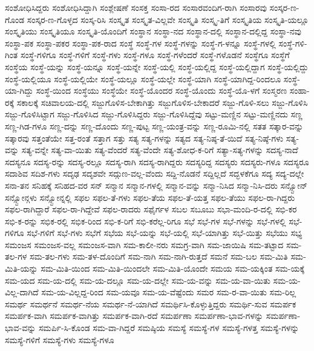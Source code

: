 {ಸಂಶೋಧಿಸಿದ್ದರು
ಸಂಶೋಧಿಸಿದ್ದಾಗಿ
ಸಂಶ್ಲೇಷಣೆ
ಸಂಸಕ್ತ
ಸಂಸಾ-ರದ
ಸಂಸಾರವಂದಿಗ-ರಾಗಿ
ಸಂಸಾರವು
ಸಂಸ್ಕರ-ಣ-ಗೊಂಡ
ಸಂಸ್ಕರ-ಣ-ಗೊಳ್ಳದ
ಸಂಸ್ಕ-ರಿಸಿ
ಸಂಸ್ಕೃತ
ಸಂಸ್ಕೃತ-ವಿಲ್ಲವೇ
ಸಂಸ್ಕೃತಿ
ಸಂಸ್ಕೃ-ತಿಗೆ
ಸಂಸ್ಕೃತಿಯ
ಸಂಸ್ಕೃತಿ-ಯಲ್ಲೂ
ಸಂಸ್ಕೃತಿಯು
ಸಂಸ್ಕೃತಿಯೂ
ಸಂಸ್ಕೃತಿ-ಯೊಂದಿಗೆ
ಸಂಸ್ಥಾನ
ಸಂಸ್ಥಾ-ನದ
ಸಂಸ್ಥಾನ-ದಲ್ಲಿ
ಸಂಸ್ಥಾನ-ದಲ್ಲಿದ್ದ
ಸಂಸ್ಥಾ-ನವು
ಸಂಸ್ಥಾ-ಪಕ
ಸಂಸ್ಥಾ-ಪಕರ
ಸಂಸ್ಥಾ-ಪಕ-ರಾದ
ಸಂಸ್ಥೆ
ಸಂಸ್ಥೆ-ಗಳ
ಸಂಸ್ಥೆ-ಗಳನ್ನು
ಸಂಸ್ಥೆ-ಗ-ಳನ್ನೂ
ಸಂಸ್ಥೆ-ಗಳಲ್ಲಿ
ಸಂಸ್ಥೆ-ಗಳಿ-ಗಿಂತ
ಸಂಸ್ಥೆ-ಗಳಿಗೂ
ಸಂಸ್ಥೆ-ಗಳಿಗೆ
ಸಂಸ್ಥೆ-ಗಳು
ಸಂಸ್ಥೆ-ಗಳೂ
ಸಂಸ್ಥೆ-ಗಳೆಂದರೆ
ಸಂಸ್ಥೆ-ಗಳೊಡನೆ
ಸಂಸ್ಥೆಗೂ
ಸಂಸ್ಥೆಗೆ
ಸಂಸ್ಥೆಯ
ಸಂಸ್ಥೆ-ಯನ್ನು
ಸಂಸ್ಥೆ-ಯನ್ನೂ
ಸಂಸ್ಥೆ-ಯನ್ನೇ
ಸಂಸ್ಥೆ-ಯಲ್ಲಿ
ಸಂಸ್ಥೆ-ಯಲ್ಲಿದ್ದ
ಸಂಸ್ಥೆ-ಯಲ್ಲಿದ್ದಾಗ
ಸಂಸ್ಥೆ-ಯಲ್ಲಿದ್ದು
ಸಂಸ್ಥೆ-ಯಲ್ಲಿಯೂ
ಸಂಸ್ಥೆ-ಯಲ್ಲಿಯೇ
ಸಂಸ್ಥೆ-ಯಲ್ಲೂ
ಸಂಸ್ಥೆ-ಯಲ್ಲೇ
ಸಂಸ್ಥೆ-ಯಾಗಿ
ಸಂಸ್ಥೆ-ಯಾಗಿದ್ದ-ರಿಂದಲೂ
ಸಂಸ್ಥೆ-ಯಾ-ಗಿದ್ದು
ಸಂಸ್ಥೆ-ಯಿಂದ
ಸಂಸ್ಥೆಯು
ಸಂಸ್ಥೆಯೇ
ಸಂಸ್ಥೆ-ಯೊಂದರ
ಸಂಸ್ಥೆ-ಯೊಂದು
ಸಂಸ್ಥೆ-ಯೊ-ಳಗೆ
ಸಂಸ್ಮರಣ
ಸಂಹಾ-ರಕ್ಕೆ
ಸಕಾಲಕ್ಕೆ
ಸಚಿವಾಲಯ-ದಲ್ಲಿ
ಸಜ್ಜುಗೊಳಿಸ-ಬೇಕಾಗಿತ್ತು
ಸಜ್ಜುಗೊಳಿಸ-ಬೇಕಾದರೆ
ಸಜ್ಜು-ಗೊಳಿ-ಸಲು
ಸಜ್ಜು-ಗೊಳಿಸಿ
ಸಜ್ಜು-ಗೊಳಿಸಿಟ್ಟಾಗ
ಸಜ್ಜು-ಗೊಳಿಸಿದ
ಸಜ್ಜು-ಗೊಳಿಸಿದ್ದರು
ಸಜ್ಜು-ಗೊಳಿಸಿದ್ದೆವು
ಸಟ್ಟು-ಮಣ್ಣಿನ
ಸಟ್ಟು-ಮಣ್ಣಿನದು
ಸಣ್ಣ
ಸಣ್ಣ-ಗಿಡ-ಗಳೂ
ಸಣ್ಣ-ದನ್ನು
ಸಣ್ಣ-ದೊಂದು
ಸಣ್ಣ-ಪುಟ್ಟ
ಸಣ್ಣ-ಯಂತ್ರ-ವನ್ನು
ಸಣ್ಣ-ರೂಮಿ-ನಲ್ಲಿ
ಸತತ
ಸತ್ಕಾರ-ವನ್ನು
ಸತ್ಕಾರವು
ಸತ್ತಂತೆಯೇ
ಸತ್ತ-ರಂತೆ
ಸತ್ತಾಗ
ಸತ್ತು
ಸತ್ಯ
ಸತ್ಯ-ಗಳನ್ನು
ಸತ್ಯದ
ಸತ್ಯ-ನಿಷ್ಠ-ತೆ-ಯಿದೆ
ಸತ್ಯ-ನಿಷ್ಠೆ-ಗಳು
ಸತ್ಯ-ವನ್ನು
ಸತ್ಯ-ವನ್ನೇ
ಸತ್ಯ-ವಾ-ಯಿತು
ಸತ್ಯ-ವೆಂದರೆ
ಸತ್ಯ-ವೆಂದೇ
ಸತ್ಯ-ಶೋಧ-ಕ-ರಿಗೆ
ಸತ್ಯಾ-ಸತ್ಯ-ಗಳನ್ನು
ಸದಸ್ಯ-ನಾದೆ
ಸದಸ್ಯನೂ
ಸದಸ್ಯ-ರನ್ನು
ಸದಸ್ಯ-ರಲ್ಲೂ
ಸದಸ್ಯ-ರಾಗಿ
ಸದಸ್ಯ-ರಾಗಿದ್ದರು
ಸದಸ್ಯರಿದ್ದ
ಸದಸ್ಯರು
ಸದಸ್ಯರು-ಗಳೂ
ಸದಸ್ಯರೂ
ಸದಾಶಿವ
ಸದಿಶ-ಗಳು
ಸದೃಢ
ಸದೃಶವೇ
ಸದ್ಗುಣ-ವಲ್ಲ-ವೆಂದು
ಸದ್ದಿ-ನೊಡನೆ
ಸದ್ದಿಲ್ಲದೆ
ಸದ್ಭಳಕೆಗೂ
ಸದ್ಯ
ಸದ್ಯ-ದಲ್ಲೇ
ಸನಾ-ತನ
ಸನಿಹಕ್ಕೆ
ಸನಿಹದ-ವರ
ಸನ್
ಸನ್ಮಾನ
ಸನ್ಮಾನ-ಗಳಲ್ಲಿ
ಸನ್ಮಾನ-ವನ್ನು
ಸನ್ಮಾ-ನಿಸಿದ
ಸನ್ಮಾ-ನಿಸಿ-ದರು
ಸನ್ಸ್ಟೋನ್
ಸನ್ಸ್ಟೋನ್ಗಳು
ಸನ್ಸ್ಟೋನ್ನಲ್ಲಿ
ಸಫಲ
ಸಫಲ-ತೆ-ಗಳು
ಸಫಲ-ತೆಯ
ಸಫಲ-ತೆ-ಯತ್ತ
ಸಫಲ-ತೆಯು
ಸಫಲ-ರಾ-ಗಿದ್ದರು
ಸಫಲ-ರಾಗಿದ್ದಾರೆ
ಸಫಲ-ರಾ-ಗಿದ್ದೇವೆ
ಸಫಲ-ರಾದರು
ಸಫೈರ್ಗಳ
ಸಬಲ
ಸಬೂಬು
ಸಭಾ-ಮಂದಿ-ರ-ದಲ್ಲಿ
ಸಭಿ-ಕರ
ಸಭಿ-ಕ-ರನ್ನು
ಸಭಿಕ-ರಲ್ಲಿ
ಸಭಿಕ-ರಿಂದ
ಸಭಿ-ಕ-ರಿಗೆ
ಸಭಿ-ಕರೆಲ್ಲ-ರಿಗೂ
ಸಭೆ
ಸಭೆ-ಗಳ
ಸಭೆ-ಗಳನ್ನು
ಸಭೆ-ಗಳಲ್ಲಿ
ಸಭೆ-ಗಳಿಗೂ
ಸಭೆ-ಗಳಿಗೆ
ಸಭೆ-ಗಳು
ಸಭೆಗೆ
ಸಭೆಯ
ಸಭೆ-ಯನ್ನು
ಸಭೆ-ಯಲ್ಲಿ
ಸಭೆ-ಯಾಗಿತ್ತು
ಸಭೆ-ಯಿತ್ತು
ಸಭೆಯು
ಸಭ್ಯ
ಸಮಂಜಸ
ಸಮಂಜಸ-ವಲ್ಲ
ಸಮಂಜಸ-ವಾಗಿ
ಸಮ-ಕಾಲೀ-ನರು
ಸಮಗ್ರ-ವಾಗಿ
ಸಮ-ಜಾಯಿಷಿ
ಸಮ-ತಟ್ಟಾದ
ಸಮ-ತಲ-ಗಳ
ಸಮ-ತಲ-ಗಳು
ಸಮ-ತಳ-ದೊಂದಿಗೆ
ಸಮ-ನಾಗಿ
ಸಮ-ನಾಗಿ-ರುತ್ತದೆ
ಸಮನೆ
ಸಮ-ಬಲ
ಸಮ-ಮಿತಿ
ಸಮ-ಮಿತಿ-ಯನ್ನು
ಸಮ-ಮಿತಿ-ಯಿಂದ
ಸಮ-ಮಿತಿ-ಯಿಂದಲೇ
ಸಮ-ಮಿತಿ-ಯೊಂದೇ
ಸಮಯ
ಸಮ-ಯಕ್ಕಿಂತ
ಸಮ-ಯಕ್ಕೆ
ಸಮ-ಯದ
ಸಮ-ಯ-ದಲ್ಲಿ
ಸಮ-ಯ-ದಲ್ಲೂ
ಸಮ-ಯ-ದಲ್ಲೇ
ಸಮ-ಯ-ವನ್ನು
ಸಮ-ಯ-ವಾ-ಯಿತು
ಸಮ-ಯ-ವಿಲ್ಲ-ದಾಗಿದೆ
ಸಮ-ಯ-ವಿಲ್ಲದ್ದ-ರಿಂದ
ಸಮ-ಯವೂ
ಸಮ-ಯ-ವೆಷ್ಟೆಂದು
ಸಮರ
ಸಮ-ರ-ವಾ-ಯಿತು
ಸಮ-ರಿಲ್ಲ
ಸಮರ್ಥ
ಸಮರ್ಥನೆ
ಸಮರ್ಥ-ನೆಯ
ಸಮರ್ಥ-ನೆ-ಯಾಗಿದೆ
ಸಮರ್ಥಿಸಿ-ಕೊಳ್ಳುತ್ತಿದ್ದರು
ಸಮರ್ಥಿ-ಸುವ
ಸಮರ್ಪಕ
ಸಮರ್ಪಕ-ವಾಗಿ
ಸಮರ್ಪಕ-ವಾಗಿತ್ತು
ಸಮರ್ಪಕ-ವಾಗಿ-ರದೆ
ಸಮರ್ಪಣಾ
ಸಮರ್ಪಣಾ-ಭಾವ-ಗಳನ್ನು
ಸಮರ್ಪಣಾ-ಭಾವ-ವನ್ನು
ಸಮರ್ಪಿ-ಸಿ-ಕೊಂಡ
ಸಮ-ವಾ-ಗಿದ್ದರೆ
ಸಮಷ್ಠಿಯ
ಸಮಸ್ಯೆ
ಸಮಸ್ಯೆ-ಗಳ
ಸಮಸ್ಯೆ-ಗಳತ್ತ
ಸಮಸ್ಯೆ-ಗಳನ್ನು
ಸಮಸ್ಯೆ-ಗಳಿಗೆ
ಸಮಸ್ಯೆ-ಗಳು
ಸಮಸ್ಯೆ-ಗಳೂ
}
